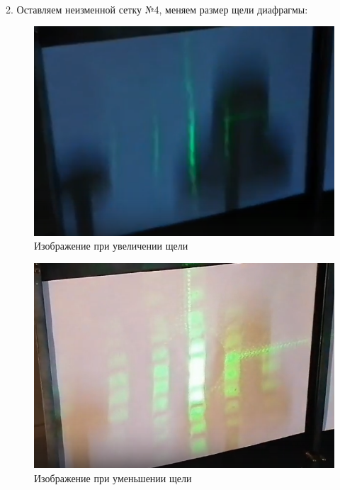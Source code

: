 \documentclass[a4paper, 12pt]{article}
\begin{document}
~

2. Оставляем неизменной сетку №4, меняем размер щели диафрагмы:

\begin{figure}[h!]
\begin{center}
\includegraphics[width=1\textwidth]{Пост_сетка-1.png}
\end{center}
\caption{Изображение при увеличении щели} \label{Сетка4(1)}
\end{figure}

\clearpage
\begin{figure}[h!]
\begin{center}
\includegraphics[width=1\textwidth]{Пост_сетка-2.png}
\end{center}
\caption{Изображение при уменьшении щели} \label{Сетка4(2)}
\end{figure}
\end{document}
